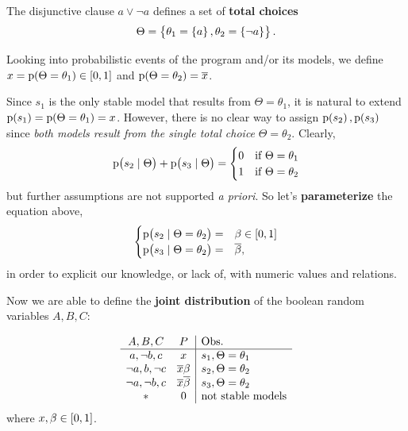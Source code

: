 \documentclass{beamer}
\newcommand{\at}[1]{\ensuremath{\!\del{#1}}}
\newcommand{\co}[1]{\ensuremath{\overline{#1}}}
\newcommand{\pr}[1]{\ensuremath{\mathrm{p}\at{#1}}}
\begin{document}
\begin{frame}    
    The disjunctive clause $a\lor\neg a$ defines a set of \textbf{total choices}
    $$
    \Theta = \set{
        \theta_1 = \set{ a },
        \theta_2 = \set{ \neg a }
    }.
    $$
\end{frame}
\begin{frame}
    
    Looking into probabilistic events of the program and/or its models, we define $x = \pr{\Theta = \theta_1}\in\intcc{0, 1}$ and $\pr{\Theta = \theta_2} = \co{x}$.
    
    Since $s_1$ is the only stable model that results from $\Theta = \theta_1$, it is natural to extend $\pr{ s_1 } = \pr{\Theta = \theta_1}  = x$. However, there is no clear way to assign $\pr{s_2}, \pr{s_3}$ since \emph{both models result from the single total choice} $\Theta = \theta_2$. Clearly, 
    $$\pr{s_2 \mid \Theta} + \pr{s_3 \mid \Theta} =
    \begin{cases}
        0 & \text{if}~\Theta = \theta_1\cr
        1 & \text{if}~\Theta = \theta_2
    \end{cases}
    $$
    but further assumptions are not supported \emph{a priori}. So let's \textbf{parameterize} the equation above,
    $$
    \begin{cases}
        \pr{s_2 \mid \Theta = \theta_2} = &\beta \in \intcc{0, 1} \cr
        \pr{s_3 \mid \Theta = \theta_2} = &\co{\beta},
    \end{cases}
    $$
    in order to explicit our knowledge, or lack of, with numeric values and relations.
\end{frame}
\begin{frame}
    Now we are able to define the \textbf{joint distribution} of the boolean random variables $A,B,C$:
    
    $$
    \begin{array}{cc|l}
        A, B, C& P & \text{Obs.}\cr
        \hline
        a, \neg b, c & x & s_1, \Theta=\theta_1\cr
        \neg a, b, \neg c & \co{x}\beta  & s_2, \Theta=\theta_2\cr
        \neg a, \neg b, c & \co{x}\co{\beta} & s_3, \Theta=\theta_2\cr
        \ast & 0&\text{not stable models}
    \end{array}
    $$
    where $x, \beta\in\intcc{0,1}$.
\end{frame}
\end{document}

